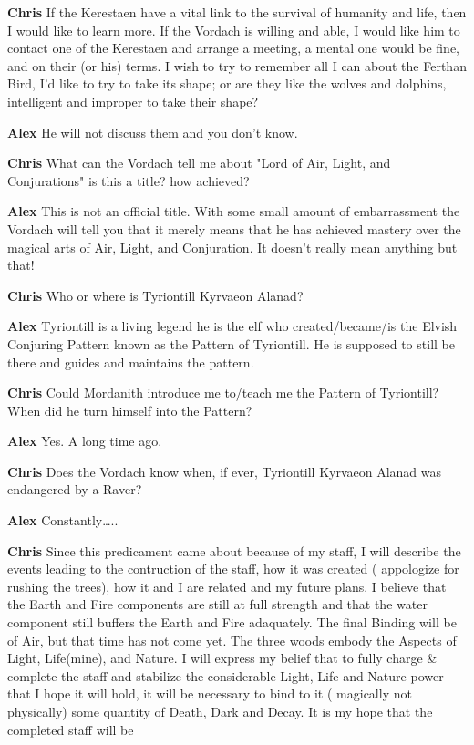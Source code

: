 {\bf Chris} If the Kerestaen have a vital link to the survival of humanity and life, 
then I would like to learn more. If the Vordach is willing and able, 
I would like him to contact one of the Kerestaen and arrange a meeting, 
a mental one would be fine, and on their (or his) terms. 
I wish to try to remember all I can about the Ferthan Bird, I'd like to 
try to take its shape; or are they like the wolves and dolphins, 
intelligent and improper to take their shape?

{\bf Alex }
He will not discuss them and you don't know.

{\bf Chris} What can the Vordach tell me about "Lord of Air, Light, and Conjurations" is 
this a title? how achieved?

{\bf Alex }
This is not an official title. With some small amount of embarrassment 
the Vordach will tell you that it merely means that he has achieved 
mastery over the magical arts of Air, Light, and Conjuration. 
It doesn't really mean anything but that!

{\bf Chris} 
Who or where is Tyriontill Kyrvaeon Alan\-ad?

{\bf Alex }
Tyriontill is a living legend\- he is the elf who created/became/is the 
Elvish Conjuring Pattern known as the Pattern of Tyriontill. He 
is supposed to still be there and guides and maintains the pattern.

{\bf Chris} 
Could Mordanith introduce me to/teach me the Pattern of Tyriontill? 
When did he turn himself into the Pattern?

{\bf Alex }
Yes. A long time ago.

{\bf Chris} Does the Vordach know when, if ever, Tyriontill 
Kyrvaeon Alan\-ad was endangered by a Raver?

{\bf Alex }
Constantly\dots.. 

{\bf Chris} 
Since this predicament came about because of my staff, I will describe the 
events leading to the contruction of the staff, how it was created (
appologize for rushing the trees), how it and I are related and my future 
plans. I believe that the Earth and Fire components are still at full 
strength and that the water component still buffers the Earth and Fire 
adaquately. The final Binding will be of Air, but that time has 
not come yet. The three woods embody the Aspects of Light, 
Life(mine), and Nature. I will express my belief that to fully charge \& 
complete the staff and stabilize the considerable Light, Life and Nature 
power that I hope it will hold, it will be necessary to bind to it (
magically not physically) some quantity of Death, Dark and Decay. 
It is my hope that the completed staff will be 

